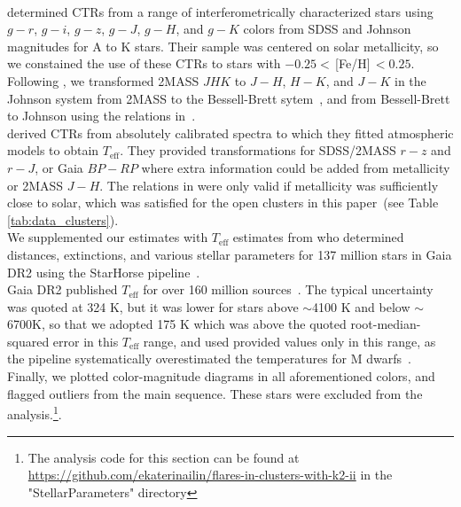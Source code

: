 \documentclass{aa}
\begin{document}
\\
\citet{boyajian_stellar_2013} determined CTRs from a range of interferometrically characterized stars using $g-r$, $g-i$, $g-z$, $g-J$, $g-H$, and $g-K$ colors from SDSS and Johnson magnitudes for A to K stars. Their sample was centered on solar metallicity, so we constained the use of these CTRs to stars with $-0.25<$\,[Fe/H]$\,<0.25$. Following \citet{boyajian_stellar_2013}, we transformed 2MASS $JHK$ to $J-H$, $H-K$, and $J-K$ in the Johnson system from 2MASS to the Bessell-Brett sytem~\citep{carpenter_color_2001}, and from Bessell-Brett to Johnson using the relations in~\citet{bessell_brett_1988}. 
\\
\citet{mann_how_2015} derived CTRs from absolutely calibrated spectra to which they fitted atmospheric models to obtain $T_\mathrm{eff}$. 
They provided transformations for SDSS/2MASS $r-z$ and $r-J$, or Gaia $BP-RP$ where extra information could be added from metallicity or 2MASS $J-H$. The relations in \citet{mann_how_2015} were only valid if metallicity was sufficiently close to solar, which was satisfied for the open clusters in this paper~(see Table \ref{tab:data_clusters}). 
\\
We supplemented our estimates with $T_\mathrm{eff}$ estimates from \citet{anders_starhorse_2019} who determined distances, extinctions, and various stellar parameters for 137 million stars in Gaia DR2 using the StarHorse pipeline~\citep{queiroz_starhorse_2018}.
\\
Gaia DR2 published $T_\mathrm{eff}$ for over 160 million sources~\citep{gaia2018}. The typical uncertainty was quoted at 324 K, but it was lower for stars above $\sim$4100 K and below $\sim$6700K, so that we adopted 175 K which was above the quoted root-median-squared error in this $T_\mathrm{eff}$ range, and used provided values only in this range, as the pipeline systematically overestimated the temperatures for M dwarfs~\citep{andrae_gaiaapsis_2018,kesseli2019}. 
\\ 
Finally, we plotted color-magnitude diagrams in all aforementioned colors, and flagged outliers from the main sequence. These stars were excluded from the analysis.\footnote{The analysis code for this section can be found at \url{https://github.com/ekaterinailin/flares-in-clusters-with-k2-ii} in the "StellarParameters" directory}.

\end{document}
